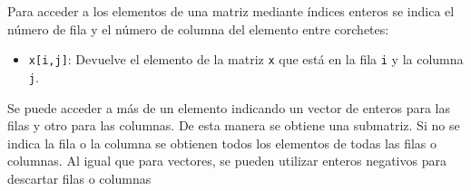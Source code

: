 \documentclass[
  spanish,
  a4paper,
]{scrreport}
\providecommand{\tightlist}{%
  \setlength{\itemsep}{0pt}\setlength{\parskip}{0pt}}
\theoremstyle{definition}
\theoremstyle{definition}
\theoremstyle{remark}
\begin{document}
Para acceder a los elementos de una matriz mediante índices enteros se
indica el número de fila y el número de columna del elemento entre
corchetes:

\begin{itemize}
\tightlist
\item
  \texttt{x{[}i,j{]}}: Devuelve el elemento de la matriz \texttt{x} que
  está en la fila \texttt{i} y la columna \texttt{j}.
\end{itemize}

Se puede acceder a más de un elemento indicando un vector de enteros
para las filas y otro para las columnas. De esta manera se obtiene una
submatriz. Si no se indica la fila o la columna se obtienen todos los
elementos de todas las filas o columnas. Al igual que para vectores, se
pueden utilizar enteros negativos para descartar filas o columnas
\end{document}
